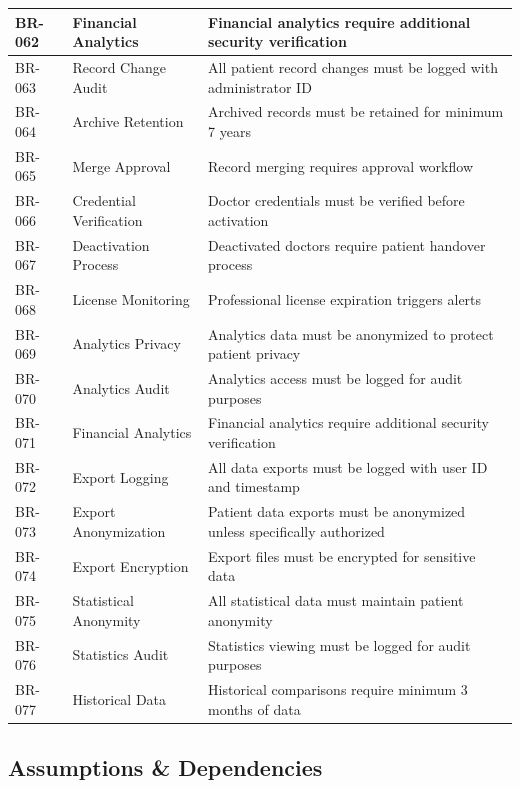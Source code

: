 \documentclass[12pt,a4paper]{article}
\begin{document}
\begin{longtable}{|p{2cm}|p{3cm}|p{9cm}|}
\hline
BR-062 & Financial Analytics & Financial analytics require additional security verification \\
\hline
BR-063 & Record Change Audit & All patient record changes must be logged with administrator ID \\
\hline
BR-064 & Archive Retention & Archived records must be retained for minimum 7 years \\
\hline
BR-065 & Merge Approval & Record merging requires approval workflow \\
\hline
BR-066 & Credential Verification & Doctor credentials must be verified before activation \\
\hline
BR-067 & Deactivation Process & Deactivated doctors require patient handover process \\
\hline
BR-068 & License Monitoring & Professional license expiration triggers alerts \\
\hline
BR-069 & Analytics Privacy & Analytics data must be anonymized to protect patient privacy \\
\hline
BR-070 & Analytics Audit & Analytics access must be logged for audit purposes \\
\hline
BR-071 & Financial Analytics & Financial analytics require additional security verification \\
\hline
BR-072 & Export Logging & All data exports must be logged with user ID and timestamp \\
\hline
BR-073 & Export Anonymization & Patient data exports must be anonymized unless specifically authorized \\
\hline
BR-074 & Export Encryption & Export files must be encrypted for sensitive data \\
\hline
BR-075 & Statistical Anonymity & All statistical data must maintain patient anonymity \\
\hline
BR-076 & Statistics Audit & Statistics viewing must be logged for audit purposes \\
\hline
BR-077 & Historical Data & Historical comparisons require minimum 3 months of data \\
\hline
\end{longtable}

\subsection{Assumptions \& Dependencies}
\end{document}
